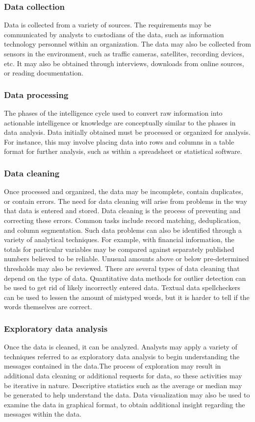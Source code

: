 \documentclass[a4paper,12pt,oneside]{report}
\begin{document}
{\subsubsection{Data collection}
{Data is collected from a variety of sources. The requirements may be communicated by analysts to custodians of the data, such as information technology personnel within an organization. The data may also be collected from sensors in the environment, such as traffic cameras, satellites, recording devices, etc. It may also be obtained through interviews, downloads from online sources, or reading documentation.}
\subsubsection{Data processing}
{The phases of the intelligence cycle used to convert raw information into actionable intelligence or knowledge are conceptually similar to the phases in data analysis.
Data initially obtained must be processed or organized for analysis. For instance, this may involve placing data into rows and columns in a table format for further analysis, such as within a spreadsheet or statistical software.}
\subsubsection{Data cleaning}
{Once processed and organized, the data may be incomplete, contain duplicates, or contain errors. The need for data cleaning will arise from problems in the way that data is entered and stored. Data cleaning is the process of preventing and correcting these errors. Common tasks include record matching, deduplication, and column segmentation. Such data problems can also be identified through a variety of analytical techniques. For example, with financial information, the totals for particular variables may be compared against separately published numbers believed to be reliable. Unusual amounts above or below pre-determined thresholds may also be reviewed. There are several types of data cleaning that depend on the type of data. Quantitative data methods for outlier detection can be used to get rid of likely incorrectly entered data. Textual data spellcheckers can be used to lessen the amount of mistyped words, but it is harder to tell if the words themselves are correct.}
\subsubsection{Exploratory data analysis}
{Once the data is cleaned, it can be analyzed. Analysts may apply a variety of techniques referred to as exploratory data analysis to begin understanding the messages contained in the data.The process of exploration may result in additional data cleaning or additional requests for data, so these activities may be iterative in nature. Descriptive statistics such as the average or median may be generated to help understand the data. Data visualization may also be used to examine the data in graphical format, to obtain additional insight regarding the messages within the data.}
}
\end{document}
